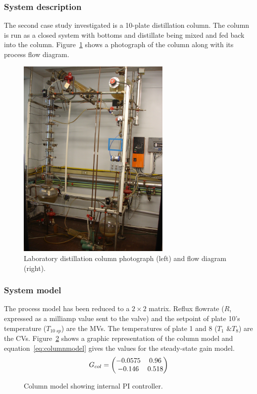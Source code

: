\subsubsection{System description}
The second case study investigated is a 10-plate distillation column.
The column is run as a closed system with bottoms and distillate being mixed and fed back into the column.
Figure~\ref{fig:columnphoto} shows a photograph of the column along with its process flow diagram.
\begin{figure}[htbp]
  \centering
    \includegraphics[width=7.4cm]{graph/columnphoto.jpg}
    \scalebox{1}{}  
  \caption[Laboratory distillation column photograph and flow diagram]{Laboratory distillation column photograph (left) and flow diagram (right).}
  \label{fig:columnphoto}
\end{figure}

\subsubsection{System model}
The process model has been reduced to a $2\times2$ matrix.
Reflux flowrate ($R$, expressed as a milliamp value sent to the valve) and the setpoint of plate 10's temperature ($T_{10~sp}$) are the MVs.
The temperatures of plate 1 and 8 ($T_1\text{ \& }T_{8}$) are the CVs.
Figure~\ref{fig:columnmodel} shows a graphic representation of the column model and equation~\ref{eq:columnmodel} gives the values for the steady-state gain model.
\begin{equation}
  \label{eq:columnmodel}
  G_{col} = \bpm -0.0575 & 0.96 \\       %
                -0.146  & 0.518 \\ \epm %
\end{equation}
\begin{figure}[htbp]
  \centering
    \scalebox{1}{}  
  \caption[Column model]{Column model showing internal PI controller.}
  \label{fig:columnmodel}
\end{figure}

